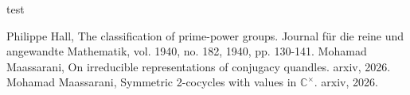\documentclass[12pt, reqno]{amsart}
\begin{document}
\begin{thebibliography}{test}

Philippe Hall, \newblock The classification of prime-power groups. \newblock Journal für die reine und angewandte Mathematik, vol. 1940, no. 182, 1940, pp. 130-141.
Mohamad Maassarani, \newblock  On irreducible representations of conjugacy quandles. \newblock arxiv, 2026.
Mohamad Maassarani, \newblock Symmetric 2-cocycles with values in $\mathbb{C}^\times$. \newblock arxiv, 2026.


 



\end{thebibliography}


 


 
\end{document}
